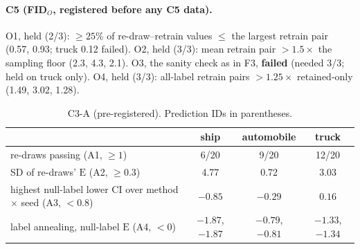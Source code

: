 \documentclass[10pt]{article}
\newcommand{\E}{\mathrm{E}}
\begin{document}
\paragraph{C5 (FID$_O$, registered before any C5 data).} O1, held (2/3): $\ge25\%$ of re-draw--retrain values $\le$ the largest retrain pair (0.57, 0.93; truck 0.12 failed). O2, held (3/3): mean retrain pair $>1.5\times$ the sampling floor (2.3, 4.3, 2.1). O3, the sanity check as in F3, \textbf{failed} (needed 3/3; held on truck only). O4, held (3/3): all-label retrain pairs $>1.25\times$ retained-only (1.49, 3.02, 1.28).

\begin{table}[h]
\centering\footnotesize\setlength{\tabcolsep}{4pt}
\caption{C3-A (pre-registered). Prediction IDs in parentheses.}
\label{tab:c3a}
\begin{tabular}{lccc}
\toprule
& ship & automobile & truck\\
\midrule
re-draws passing (A1, $\ge1$) & 6/20 & 9/20 & 12/20\\
SD of re-draws' $\E$ (A2, $\ge0.3$) & 4.77 & 0.72 & 3.03\\
highest null-label lower CI over method $\times$ seed (A3, $<0.8$) & $-0.85$ & $-0.29$ & $0.16$\\
label annealing, null-label $\E$ (A4, $<0$) & $-1.87$, $-1.87$ & $-0.79$, $-0.81$ & $-1.33$, $-1.34$\\
\bottomrule
\end{tabular}
\end{table}
\end{document}

